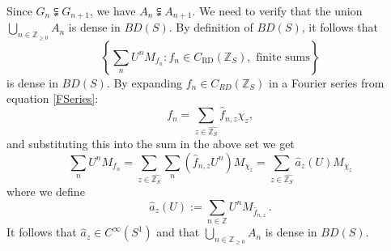 \documentclass[12pt,reqno]{amsart}
\numberwithin{equation}{section}
\newcommand{\Z}{{\mathbb Z}}
\begin{document}
Since $G_n\subsetneqq G_{n+1}$, we have $A_n\subsetneqq A_{n+1}$. We need to verify that the union
$\bigcup_{n\in\Z_{\geq0}}A_n$ is dense in $BD(S)$.  By definition of $BD(S)$, it follows that
\begin{equation*}
\left\{\sum_nU^nM_{f_n}: f_n\in C_\textrm{RD}(\Z_S), \textrm{ finite sums}\right\}
\end{equation*}
is dense in $BD(S)$.  By expanding $f_n\in C_{RD}(\Z_S)$ in a Fourier series from equation \eqref{FSeries}:
\begin{equation*}
f_n=\sum_{z\in\widehat{\Z_S}}\hat f_{n,z} \chi_z,
\end{equation*}
and substituting this into the sum in the above set we get
\begin{equation*}
\sum_n U^nM_{f_n} = \sum_{z\in\widehat{\Z_S}}\sum_n\left(\hat f_{n,z}U^n\right)M_{\chi_z} = \sum_{z\in\widehat{\Z_S}}\hat{a}_z(U)M_{\chi_z}
\end{equation*}
where we define
\begin{equation*}
\hat{a}_z(U):=\sum_{n\in\Z}U^nM_{\hat f_{n,z}}\,.
\end{equation*}
It follows that $\hat{a}_z\in C^\infty(S^1)$ and that $\bigcup_{n\in\Z_{\ge0}} A_n$ is dense in $BD(S)$.
\end{document}
